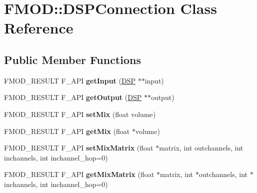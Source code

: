 \hypertarget{classFMOD_1_1DSPConnection}{}\section{F\+M\+OD\+:\+:D\+S\+P\+Connection Class Reference}
\label{classFMOD_1_1DSPConnection}
\subsection*{Public Member Functions}
\begin{DoxyCompactItemize}
\item 
\mbox{\label{classFMOD_1_1DSPConnection_a4885524212e3f791debfac1ec259ee6a}} 
F\+M\+O\+D\+\_\+\+R\+E\+S\+U\+LT F\+\_\+\+A\+PI {\bfseries get\+Input} (\hyperlink{classFMOD_1_1DSP}{D\+SP} $\ast$$\ast$input)
\item 
\mbox{\label{classFMOD_1_1DSPConnection_a813e7b67af3dcf1fad6b8ed73ad99a8d}} 
F\+M\+O\+D\+\_\+\+R\+E\+S\+U\+LT F\+\_\+\+A\+PI {\bfseries get\+Output} (\hyperlink{classFMOD_1_1DSP}{D\+SP} $\ast$$\ast$output)
\item 
\mbox{\label{classFMOD_1_1DSPConnection_a67b8373d3bead0903909ac035acfa47d}} 
F\+M\+O\+D\+\_\+\+R\+E\+S\+U\+LT F\+\_\+\+A\+PI {\bfseries set\+Mix} (float volume)
\item 
\mbox{\label{classFMOD_1_1DSPConnection_a21bceb2d4e9d4f951c137d7a2bc95572}} 
F\+M\+O\+D\+\_\+\+R\+E\+S\+U\+LT F\+\_\+\+A\+PI {\bfseries get\+Mix} (float $\ast$volume)
\item 
\mbox{\label{classFMOD_1_1DSPConnection_ace26b82a7ab3795e80a28e913d2125f2}} 
F\+M\+O\+D\+\_\+\+R\+E\+S\+U\+LT F\+\_\+\+A\+PI {\bfseries set\+Mix\+Matrix} (float $\ast$matrix, int outchannels, int inchannels, int inchannel\+\_\+hop=0)
\item 
\mbox{\label{classFMOD_1_1DSPConnection_ab374698ec55adfc99a92b915f3d588f0}} 
F\+M\+O\+D\+\_\+\+R\+E\+S\+U\+LT F\+\_\+\+A\+PI {\bfseries get\+Mix\+Matrix} (float $\ast$matrix, int $\ast$outchannels, int $\ast$inchannels, int inchannel\+\_\+hop=0)
\item 

\end{DoxyCompactItemize}
